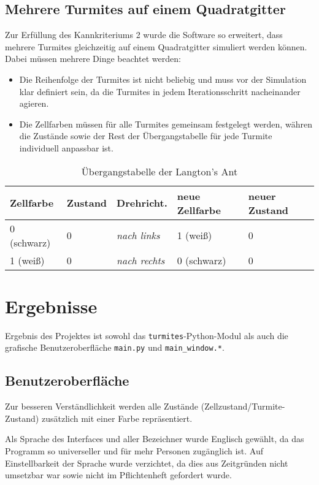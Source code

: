\subsection{Mehrere Turmites auf einem Quadratgitter}
Zur Erfüllung des Kannkriteriums 2 \cite{pflichtenheft} wurde die Software so erweitert, dass mehrere Turmites gleichzeitig auf einem Quadratgitter simuliert werden können. Dabei müssen mehrere Dinge beachtet werden:

\begin{itemize}
    \item Die Reihenfolge der Turmites ist nicht beliebig und muss vor der Simulation klar definiert sein, da die Turmites in jedem Iterationsschritt nacheinander agieren.
    \item Die Zellfarben müssen für alle Turmites gemeinsam festgelegt werden, währen die Zustände sowie der Rest der Übergangstabelle für jede Turmite individuell anpassbar ist.
\end{itemize}

\begin{table}[h]
    \centering
    \begin{tabular}{|l|l||l|l|l|}
        \textbf{Zellfarbe} & \textbf{Zustand} & \textbf{Drehricht.} & \textbf{neue Zellfarbe} & \textbf{neuer Zustand} \\
        \hline
        0 (schwarz) & 0 & \textit{nach links} & 1 (weiß) & 0 \\
        1 (weiß) & 0 & \textit{nach rechts} & 0 (schwarz) & 0 \\
    \end{tabular}
    \caption{Übergangstabelle der Langton's Ant}
\end{table}

\section{Ergebnisse}
Ergebnis des Projektes ist sowohl das \texttt{turmites}-Python-Modul als auch die grafische Benutzeroberfläche \texttt{main.py} und \texttt{main\_window.*}.

\subsection{Benutzeroberfläche}
Zur besseren Verständlichkeit werden alle Zustände (Zellzustand/Turmite-Zustand) zusätzlich mit einer Farbe repräsentiert. 

Als Sprache des Interfaces und aller Bezeichner wurde Englisch gewählt, da das Programm so universeller und für mehr Personen zugänglich ist. Auf Einstellbarkeit der Sprache wurde verzichtet, da dies aus Zeitgründen nicht umsetzbar war sowie nicht im Pflichtenheft \cite{pflichtenheft} gefordert wurde.


